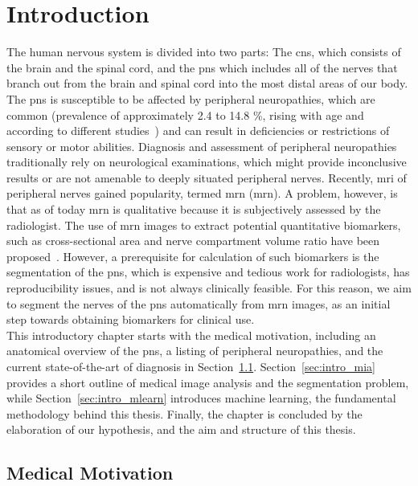 \chapter{Introduction} %
The human nervous system is divided into two parts: The \gls{cns}, which consists of the brain and the spinal cord, and the \gls{pns} which includes all of the nerves that branch out from the brain and spinal cord into the most distal areas of our body. The \gls{pns} is susceptible to be affected by peripheral neuropathies, which are common (prevalence of approximately 2.4 to 14.8 \%, rising with age and according to different studies~\cite{Martyn1997EpidemiologyNeuropathy,Gregg2004PrevalenceSurvey}) and can result in deficiencies or restrictions of sensory or motor abilities. Diagnosis and assessment of peripheral neuropathies traditionally rely on neurological examinations, which might provide inconclusive results or are not amenable to deeply situated peripheral nerves. Recently, \gls{mri} of peripheral nerves gained popularity, termed \acrlong{mrn} (\acrshort{mrn}). A problem, however, is that as of today \acrshort{mrn} is qualitative because it is subjectively assessed by the radiologist. The use of \acrshort{mrn} images to extract potential quantitative biomarkers, such as cross-sectional area and nerve compartment volume ratio have been proposed~\cite{Balsiger2018SegmentationApproach,Kronlage2017,Felisaz2017MRNeuropathy.}. However, a prerequisite for calculation of such biomarkers is the segmentation of the \gls{pns}, which is expensive and tedious work for radiologists, has reproducibility issues, and is not always clinically feasible. For this reason, we aim to segment the nerves of the \gls{pns} automatically from \acrshort{mrn} images, as an initial step towards obtaining biomarkers for clinical use.\\
This introductory chapter starts with the medical motivation, including an anatomical overview of the \gls{pns}, a listing of peripheral neuropathies, and the current state-of-the-art of diagnosis in Section~\ref{sec:intro_medical}. Section~\ref{sec:intro_mia} provides a short outline of medical image analysis and the segmentation problem, while  Section~\ref{sec:intro_mlearn} introduces machine learning, the fundamental methodology behind this thesis. Finally, the chapter is concluded by the elaboration of our hypothesis, and the aim and structure of this thesis.

\section{Medical Motivation} \label{sec:intro_medical} %

